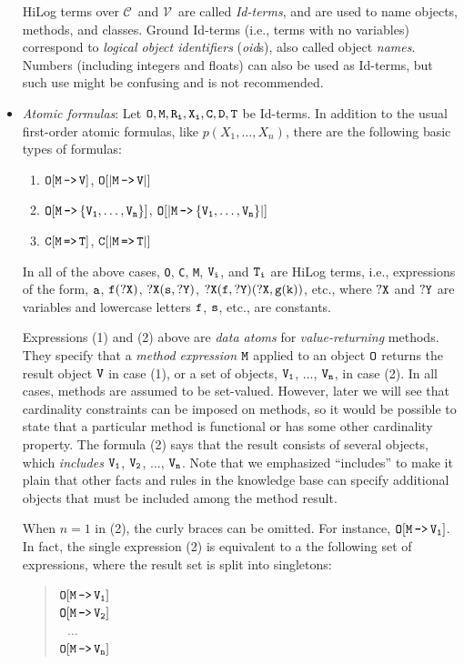 \documentclass[11pt]{article}
\newcommand{\mvd}{{\mbox{\tt \,->\,}}}  %
\newcommand{\Mvd}{{\mbox{\tt \,=>\,}}}  %
\newcommand{\fl}{\mbox{F-logic}\xspace}
\newcommand{\consts}{\ensuremath{\mathcal{C}}\xspace}
\newcommand{\vars}{\ensuremath{\mathcal{V}}\xspace}
\begin{document}
\begin{itemize}
    HiLog terms over \consts\ and \vars\ are called \emph{Id-terms},
    and are used to name objects, methods, and classes.  Ground Id-terms
    (i.e., terms with no variables) correspond to \emph{logical
      object identifiers} (\emph{oid}s), also called object \emph{names}.
    Numbers (including integers and floats) can also be used as Id-terms,
    but such use might be confusing and is not recommended.
  \index{atomic formula!in \fl}
\item \emph{Atomic formulas}: Let $\tt O,M,R_{i},X_{i},C,D,T$ be Id-terms.  In
  addition to the usual first-order atomic formulas, like
  $p(X_1,\dots,X_n)$, there are the following basic types of formulas:
  \medskip

  \begin{enumerate}
    \item \label{eq-value-atom} $\tt O[M\mvd V]$, $\tt O[|M\mvd V|]$
    \item $\tt O[M\mvd \{V_1,\dots,V_n\}]$, $\tt O[|M\mvd \{V_1,\dots,V_n\}|]$
    \item $\tt C[M\Mvd T]$, $\tt C[|M\Mvd T|]$
  \end{enumerate}
  
  In all of the above cases, {\tt O}, {\tt C}, {\tt M}, ${\tt V_i}$, and
  ${\tt T_i}$ are HiLog terms, i.e., expressions of the form, $\tt a$,
  $\tt f(?X)$, $\tt ?X(s,?Y)$, $\tt ?X(f,?Y)(?X,g(k))$, etc., where $\tt ?X$
  and $\tt ?Y$ are variables and lowercase letters $\tt f$, $\tt s$, etc., are
  constants.
  
  Expressions (1) and (2) above are \emph{data atoms} for
  \emph{value-returning} methods. They specify that a
  \emph{method expression} $\tt M$ applied to an object $\tt O$ returns the
  result object $\tt V$ in case (1), or a set of objects, $\tt V_1$, ...,
  $\tt V_n$, in case (2). In all cases, methods are assumed to be
  set-valued. However, later we will see that cardinality
  constraints can be imposed on methods, so it would be possible to state
  that a particular method is functional or has some other cardinality
  property.
  The formula (2) says that
  the result consists of several objects, which \emph{includes} $\tt V_1$,
  $\tt V_2$, ..., $\tt V_n$. Note that we emphasized ``includes''
  to make it plain that other facts and rules in the knowledge base can specify
  additional objects that must be included among the method result.
  
  When $n=1$ in (2), the curly braces can be omitted. For
  instance, $\tt O[M\mvd V_1]$. In fact, the single expression (2) is
  equivalent to a the following set of expressions, where the result set is
  split into singletons:
  \begin{quote}
  $\tt O[M\mvd V_1]$    \\
  $\tt O[M\mvd V_2]$    \\
  $~~~\dots$\\
  $\tt O[M\mvd V_n]$
  \end{quote}
  

\end{itemize}
\end{document}
